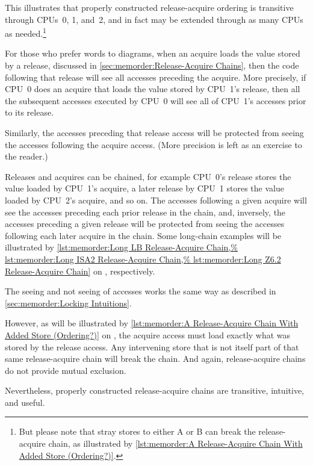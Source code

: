 This illustrates that properly constructed release-acquire ordering is
transitive through CPUs~0, 1, and~2, and in fact may be extended through
as many CPUs as needed.\footnote{
	But please note that stray stores to either A or B can break
	the release-acquire chain, as illustrated by
	\cref{lst:memorder:A Release-Acquire Chain With Added Store (Ordering?)}.}

For those who prefer words to diagrams, when an acquire loads the value
stored by a release, discussed in
\cref{sec:memorder:Release-Acquire Chains},
then the code following that release will see all accesses preceding
the acquire.
More precisely, if CPU~0 does an acquire that loads the value stored by
CPU~1's release, then all the subsequent accesses executed by CPU~0 will
see all of CPU~1's accesses prior to its release.

Similarly, the accesses preceding that release access will be protected
from seeing the accesses following the acquire access.
(More precision is left as an exercise to the reader.)

Releases and acquires can be chained, for example CPU~0's release
stores the value loaded by CPU~1's acquire, a later release by CPU~1
stores the value loaded by CPU~2's acquire, and so on.
The accesses following a given acquire will see the accesses preceding
each prior release in the chain, and, inversely, the accesses preceding a
given release will be protected from seeing the accesses following each
later acquire in the chain.
Some long-chain examples will be illustrated by
\cref{lst:memorder:Long LB Release-Acquire Chain,%
lst:memorder:Long ISA2 Release-Acquire Chain,%
lst:memorder:Long Z6.2 Release-Acquire Chain}
on
,
respectively.

The seeing and not seeing of accesses works the same way as described in
\cref{sec:memorder:Locking Intuitions}.

However, as will be illustrated by
\cref{lst:memorder:A Release-Acquire Chain With Added Store (Ordering?)}
on
,
the acquire access must load exactly what was stored by the release access.
Any intervening store that is not itself part of that same release-acquire
chain will break the chain.
And again, release-acquire chains do not provide mutual exclusion.

Nevertheless, properly constructed release-acquire chains are transitive,
intuitive, and useful.

